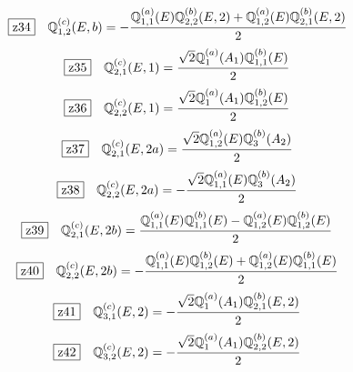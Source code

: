 \documentclass[fleqn,10pt,landscape]{jsarticle}
\begin{document}
\begin{dmath*}
\hspace*{3mm}\fbox{z34}\quad \mathbb{Q}_{1,2}^{(c)}(E,b)=- \frac{\mathbb{Q}_{1,1}^{(a)}(E) \mathbb{Q}_{2,2}^{(b)}(E,2) + \mathbb{Q}_{1,2}^{(a)}(E) \mathbb{Q}_{2,1}^{(b)}(E,2)}{2}
\end{dmath*}
\begin{dmath*}
\hspace*{3mm}\fbox{z35}\quad \mathbb{Q}_{2,1}^{(c)}(E,1)=\frac{\sqrt{2} \mathbb{Q}_{1}^{(a)}(A_{1}) \mathbb{Q}_{1,1}^{(b)}(E)}{2}
\end{dmath*}
\begin{dmath*}
\hspace*{3mm}\fbox{z36}\quad \mathbb{Q}_{2,2}^{(c)}(E,1)=\frac{\sqrt{2} \mathbb{Q}_{1}^{(a)}(A_{1}) \mathbb{Q}_{1,2}^{(b)}(E)}{2}
\end{dmath*}
\begin{dmath*}
\hspace*{3mm}\fbox{z37}\quad \mathbb{Q}_{2,1}^{(c)}(E,2a)=\frac{\sqrt{2} \mathbb{Q}_{1,2}^{(a)}(E) \mathbb{Q}_{3}^{(b)}(A_{2})}{2}
\end{dmath*}
\begin{dmath*}
\hspace*{3mm}\fbox{z38}\quad \mathbb{Q}_{2,2}^{(c)}(E,2a)=- \frac{\sqrt{2} \mathbb{Q}_{1,1}^{(a)}(E) \mathbb{Q}_{3}^{(b)}(A_{2})}{2}
\end{dmath*}
\begin{dmath*}
\hspace*{3mm}\fbox{z39}\quad \mathbb{Q}_{2,1}^{(c)}(E,2b)=\frac{\mathbb{Q}_{1,1}^{(a)}(E) \mathbb{Q}_{1,1}^{(b)}(E) - \mathbb{Q}_{1,2}^{(a)}(E) \mathbb{Q}_{1,2}^{(b)}(E)}{2}
\end{dmath*}
\begin{dmath*}
\hspace*{3mm}\fbox{z40}\quad \mathbb{Q}_{2,2}^{(c)}(E,2b)=- \frac{\mathbb{Q}_{1,1}^{(a)}(E) \mathbb{Q}_{1,2}^{(b)}(E) + \mathbb{Q}_{1,2}^{(a)}(E) \mathbb{Q}_{1,1}^{(b)}(E)}{2}
\end{dmath*}
\begin{dmath*}
\hspace*{3mm}\fbox{z41}\quad \mathbb{Q}_{3,1}^{(c)}(E,2)=- \frac{\sqrt{2} \mathbb{Q}_{1}^{(a)}(A_{1}) \mathbb{Q}_{2,1}^{(b)}(E,2)}{2}
\end{dmath*}
\begin{dmath*}
\hspace*{3mm}\fbox{z42}\quad \mathbb{Q}_{3,2}^{(c)}(E,2)=- \frac{\sqrt{2} \mathbb{Q}_{1}^{(a)}(A_{1}) \mathbb{Q}_{2,2}^{(b)}(E,2)}{2}
\end{dmath*}
\vspace{5mm}
\end{document}
